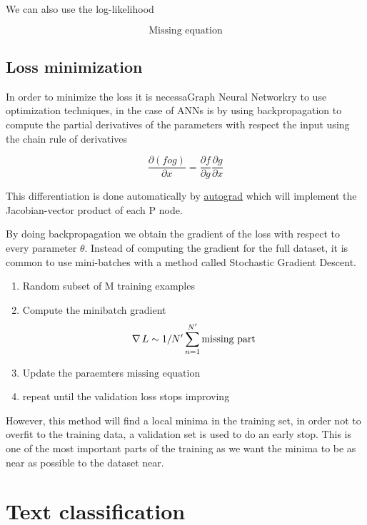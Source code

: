 We can also use the log-likelihood

\begin{equation}
  \text{Missing equation}
\end{equation}

\subsection{Loss minimization}

In order to minimize the loss it is necessaGraph Neural Networkry to use optimization techniques,
in the case of \glspl{ANN} is by using backpropagation to
compute the partial derivatives of the parameters with respect the input using
the chain rule of derivatives

\begin{equation}
  \frac{\partial(f o g)}{\partial x} = \frac{\partial f}{\partial
  g}\frac{\partial g}{\partial x}
\end{equation}

This differentiation is done automatically by
\href{https://github.com/HIPS/autograd}{autograd} which will implement the
Jacobian-vector product of each P node.

By doing backpropagation we obtain the gradient of the loss with respect to
every parameter $\theta$. Instead of computing the gradient for the full
dataset, it is common to use mini-batches with a method called Stochastic
Gradient Descent.

\begin{enumerate}
  \item Random subset of M training examples
  \item Compute the minibatch gradient
    \begin{equation}
      \operatorname*{\nabla} L \sim 1/N' \sum_{n=1}^{N'} \text{missing part}
    \end{equation}
  \item Update the paraemters $\text{missing equation}$
  \item repeat until the validation loss stops improving
\end{enumerate}

However, this method will find a local minima in the training set, in order not
to overfit to the training data, a validation set is used to do an early stop.
This is one of the most important parts of the training as we want the minima
to be as near as possible to the dataset near.

\section{Text classification}

